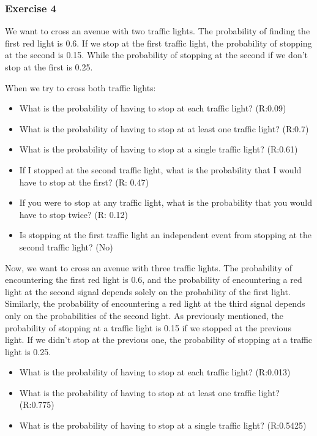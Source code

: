 \documentclass[
]{book}
\providecommand{\tightlist}{%
  \setlength{\itemsep}{0pt}\setlength{\parskip}{0pt}}
\begin{document}
\hypertarget{exercise-4}{%
\subsubsection{Exercise 4}\label{exercise-4}}

We want to cross an avenue with two traffic lights. The probability of finding the first red light is 0.6. If we stop at the first traffic light, the probability of stopping at the second is 0.15. While the probability of stopping at the second if we don't stop at the first is 0.25.

When we try to cross both traffic lights:

\begin{itemize}
\tightlist
\item
  What is the probability of having to stop at each traffic light? (R:0.09)
\item
  What is the probability of having to stop at at least one traffic light? (R:0.7)
\item
  What is the probability of having to stop at a single traffic light? (R:0.61)
\item
  If I stopped at the second traffic light, what is the probability that I would have to stop at the first? (R: 0.47)
\item
  If you were to stop at any traffic light, what is the probability that you would have to stop twice? (R: 0.12)
\item
  Is stopping at the first traffic light an independent event from stopping at the second traffic light? (No)
\end{itemize}

Now, we want to cross an avenue with three traffic lights. The probability of encountering the first red light is 0.6, and the probability of encountering a red light at the second signal depends solely on the probability of the first light. Similarly, the probability of encountering a red light at the third signal depends only on the probabilities of the second light. As previously mentioned, the probability of stopping at a traffic light is 0.15 if we stopped at the previous light. If we didn't stop at the previous one, the probability of stopping at a traffic light is 0.25.

\begin{itemize}
\item
  What is the probability of having to stop at each traffic light? (R:0.013)
\item
  What is the probability of having to stop at at least one traffic light? (R:0.775)
\item
  What is the probability of having to stop at a single traffic light? (R:0.5425)
\end{itemize}
\end{document}

